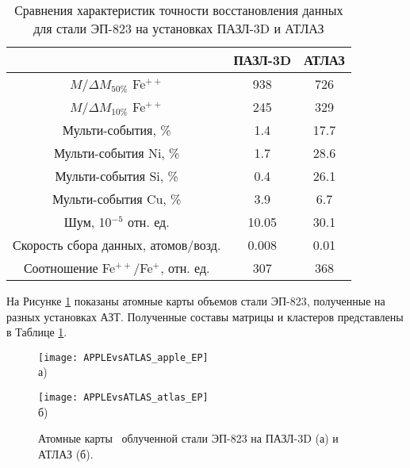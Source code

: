 \begin{table} [htbp]
	\centering
	\caption{Сравнения характеристик точности восстановления данных для стали ЭП-823 на установках ПАЗЛ-3D и АТЛАЗ}
	\label{tab:paramsAPPLEvsATLAS_EP3}
	\begin{SingleSpace}
		\begin{tabular} {| c | c | c |}
			\hline
			{}                                     & ПАЗЛ-3D & АТЛАЗ   \\ \hline
			$M/\Delta M_{50\%}$ Fe$^{++}$             & 938     & 726     \\ \hline
			$M/\Delta M_{10\%}$ Fe$^{++}$             & 245     & 329     \\ \hline
			Мульти-события, \%                     & 1.4     & 17.7                 \\ \hline
			Мульти-события Ni, \%                  & 1.7     & 28.6             \\ \hline
			Мульти-события Si, \%                  & 0.4     & 26.1             \\ \hline
			Мульти-события Cu, \%                  & 3.9     & 6.7             \\ \hline
			Шум, 10$^{-5}$ отн. ед.                & 10.05   & 30.1     \\ \hline
			Скорость сбора данных, атомов/возд.    & 0.008   & 0.01  \\ \hline
			Соотношение Fe$^{++}$/Fe$^{+}$, отн. ед. & 307     & 368     \\ \hline
		\end{tabular}
	\end{SingleSpace}
\end{table}

На Рисунке \cref{fig:APPLEvsATLAS_EP} показаны атомные карты объемов стали ЭП-823, полученные на разных установках АЗТ. Полученные составы матрицы и кластеров представлены в Таблице \cref{fig:APPLEvsATLAS_EP}.

\begin{figure}[h!tb]
	\begin{minipage}[b][][b]{0.49\textwidth}\centering
		\texttt{[image: APPLEvsATLAS\_apple\_EP]} \\ а)
	\end{minipage}
	\begin{minipage}[b][][b]{0.49\textwidth}\centering
		\texttt{[image: APPLEvsATLAS\_atlas\_EP]} \\ б)
	\end{minipage}
	\caption{Атомные карты~\cite{scbibAPPLEvsATLAS} облученной стали ЭП-823 на ПАЗЛ-3D (а) и АТЛАЗ (б).}
	\label{fig:APPLEvsATLAS_EP}
\end{figure} 

